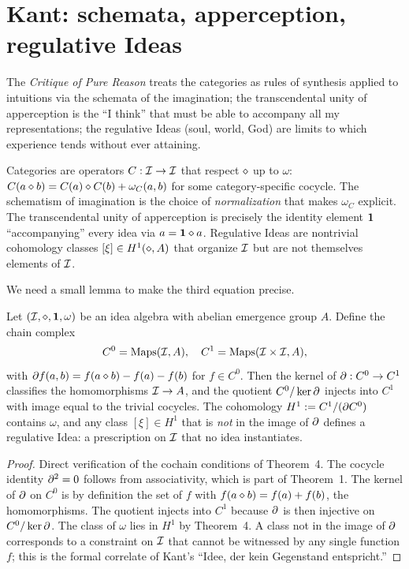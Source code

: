 \section{Kant: schemata, apperception, regulative
Ideas}\label{sec:kant}

 The \emph{Critique of Pure Reason}
\cite{Kant1781} treats the categories as rules of synthesis applied to
intuitions via the schemata of the imagination; the transcendental unity
of apperception is the ``I think'' that must be able to accompany all my
representations; the regulative Ideas (soul, world, God) are limits to
which experience tends without ever attaining.

\formalclaim Categories are operators $C:\mathcal{I}\to\mathcal{I}$ that respect
$\mathbin{\diamond}$ up to $\omega$: $C(a\mathbin{\diamond} b) = C(a)\mathbin{\diamond} C(b) +
\omega_C(a,b)$ for some category-specific cocycle. The schematism of
imagination is the choice of \emph{normalization} that makes $\omega_C$
explicit. The transcendental unity of apperception is precisely the
identity element $\mathbf{1}$ ``accompanying'' every idea via $a = \mathbf{1}
\mathbin{\diamond} a$. Regulative Ideas are nontrivial cohomology classes
$[\xi]\in H^1(\mathbin{\diamond}, A)$ that organize $\mathcal{I}$ but are not
themselves elements of $\mathcal{I}$.

We need a small lemma to make the third equation precise.

\begin{lemma}\label{lem:regulative}
Let $(\mathcal{I},\mathbin{\diamond},\mathbf{1},\omega)$ be an idea algebra with abelian
emergence group $A$. Define the chain complex
\[
  C^0 = \mathrm{Maps}(\mathcal{I}, A),\quad
  C^1 = \mathrm{Maps}(\mathcal{I}\times\mathcal{I}, A),
\]
with $\partial f(a,b) = f(a\mathbin{\diamond} b) - f(a) - f(b)$ for $f\in C^0$. Then
the kernel of $\partial:C^0\to C^1$ classifies the homomorphisms
$\mathcal{I}\to A$, and the quotient $C^0/\ker\partial$ injects into $C^1$ with
image equal to the trivial cocycles. The cohomology $H^1\mathrel{:=}
C^1/(\partial C^0)$ contains $\omega$, and any class $[\xi]\in H^1$ that is
\emph{not} in the image of $\partial$ defines a regulative Idea: a
prescription on $\mathcal{I}$ that no idea instantiates.
\end{lemma}

\begin{proof}
Direct verification of the cochain conditions of Theorem~4. The cocycle
identity $\partial^2=0$ follows from associativity, which is part of
Theorem~1. The kernel of $\partial$ on $C^0$ is by definition the set of
$f$ with $f(a\mathbin{\diamond} b)=f(a)+f(b)$, the homomorphisms. The quotient
injects into $C^1$ because $\partial$ is then injective on
$C^0/\ker\partial$. The class of $\omega$ lies in $H^1$ by Theorem~4. A
class not in the image of $\partial$ corresponds to a constraint on
$\mathcal{I}$ that cannot be witnessed by any single function $f$; this is
the formal correlate of Kant's ``Idee, der kein Gegenstand entspricht.''
\end{proof}

